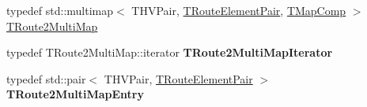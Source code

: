 \begin{DoxyCompactItemize}
\item 
typedef std\+::multimap$<$ T\+H\+V\+Pair, \mbox{\hyperlink{class_t_all_routes_a159a7d547e3d435d109a36cb41193a78}{T\+Route\+Element\+Pair}}, \mbox{\hyperlink{class_t_map_comp}{T\+Map\+Comp}} $>$ \mbox{\hyperlink{class_t_all_routes_a1d2aa3032df6e13d1f6f1a93f96157c6}{T\+Route2\+Multi\+Map}}
\item 
\mbox{\label{class_t_all_routes_a44189363afe506f3f87c3cb6f81c539b}} 
typedef T\+Route2\+Multi\+Map\+::iterator {\bfseries T\+Route2\+Multi\+Map\+Iterator}
\item 
\mbox{\label{class_t_all_routes_a993331007a31dae38f2d81afe0796ef4}} 
typedef std\+::pair$<$ T\+H\+V\+Pair, \mbox{\hyperlink{class_t_all_routes_a159a7d547e3d435d109a36cb41193a78}{T\+Route\+Element\+Pair}} $>$ {\bfseries T\+Route2\+Multi\+Map\+Entry}
\end{DoxyCompactItemize}
